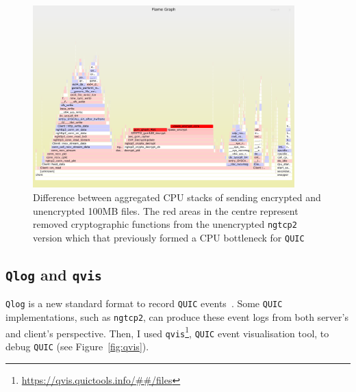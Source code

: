 \documentclass[12pt,a4paper,twoside,openright]{report}
\newcommand\note[2]{{\color{#1}\bf #2}}
\newcommand\simon[1]{\ifcomments{\note{cyan}{SM: #1}}\fi}
\begin{document}
    \begin{figure}[H]
    \centering
    \includegraphics[width=0.9\textwidth]{figs/perf-kernel__johns_BIG_letter__encrypted_minus_perf-kernel__johns_BIG_letter__unencrypted.png}
    \caption[Difference between aggregated CPU stacks of sending encrypted and unencrypted 100MB files]{Difference between aggregated CPU stacks of sending encrypted and unencrypted 100MB files. The red areas in the centre represent removed cryptographic functions from the unencrypted \texttt{ngtcp2} version which that previously formed a CPU bottleneck for \texttt{QUIC}}
    \label{fig:perf-kernel__johns_BIG_letter__encrypted_minus_perf-kernel__johns_BIG_letter__unencrypted}
    \end{figure}






    
\subsection{\texttt{Qlog} and \texttt{qvis}}

\texttt{Qlog} is a new standard format to record \texttt{QUIC} events~\cite{draft-marx-qlog-event-definitions-quic-h3}.
Some \texttt{QUIC} implementations, such as \texttt{ngtcp2}, can produce these event logs from both server's and client's perspective.
Then, I used \texttt{qvis}\footnote{\url{https://qvis.quictools.info/##/files}}, \texttt{QUIC} event visualisation tool, to debug \texttt{QUIC} (see Figure~\ref{fig:qvis}).
\end{document}
